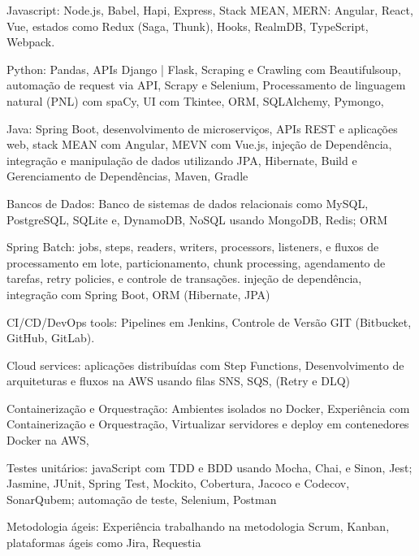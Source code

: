 \documentclass[a4paper,10pt]{article}
\begin{document}
\textcolor{corSubSection}{Javascript:}
Node.js, Babel, Hapi, Express, Stack MEAN, MERN: Angular, React, Vue, estados como Redux (Saga, Thunk), Hooks, RealmDB, TypeScript, Webpack.

\textcolor{corSubSection}{Python:}
Pandas, APIs Django | Flask, Scraping e Crawling com Beautifulsoup, automação de request via API, Scrapy e Selenium, Processamento de linguagem natural (PNL) com spaCy, UI com Tkintee, ORM, SQLAlchemy, Pymongo,

\textcolor{corSubSection}{Java:}
Spring Boot, desenvolvimento de microserviços, APIs REST e aplicações web, stack MEAN com Angular, MEVN com Vue.js, injeção de Dependência, integração e manipulação de dados utilizando JPA, Hibernate, Build e Gerenciamento de Dependências, Maven, Gradle

\textcolor{corSubSection}{Bancos de Dados:}
Banco de sistemas de dados relacionais como MySQL, PostgreSQL, SQLite e, DynamoDB, NoSQL usando MongoDB, Redis; ORM

\textcolor{corSubSection}{Spring Batch:}
jobs, steps, readers, writers, processors, listeners, e fluxos de processamento em lote, particionamento, chunk processing, agendamento de tarefas, retry policies, e controle de transações. injeção de dependência, integração com Spring Boot, ORM (Hibernate, JPA)

\textcolor{corSubSection}{CI/CD/DevOps tools:}
Pipelines em Jenkins, Controle de Versão GIT (Bitbucket, GitHub, GitLab).

\textcolor{corSubSection}{Cloud services:}
aplicações distribuídas com Step Functions, Desenvolvimento de arquiteturas e fluxos na AWS usando filas SNS, SQS, (Retry e DLQ)

\textcolor{corSubSection}{Containerização e Orquestração:}
Ambientes isolados no Docker, Experiência com Containerização e Orquestração, Virtualizar servidores e deploy em contenedores Docker na AWS,

\textcolor{corSubSection}{Testes unitários:}
javaScript com TDD e BDD usando Mocha, Chai, e Sinon, Jest; Jasmine, JUnit, Spring Test, Mockito, Cobertura, Jacoco e Codecov, SonarQubem; automação de teste, Selenium, Postman

\textcolor{corSubSection}{Metodologia ágeis:}
Experiência trabalhando na metodologia Scrum, Kanban, plataformas ágeis como Jira, Requestia

\end{document}
